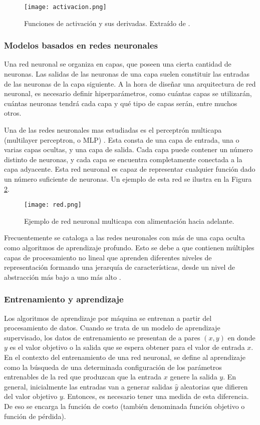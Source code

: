 \begin{figure}[H]
  \centering{}
  \texttt{[image: activacion.png]}
  \caption{Funciones de activación y sus derivadas. Extraído de \cite{lagartija}.}
  \label{fig:activación}
\end{figure}

\subsubsection{Modelos basados en redes neuronales}

Una red neuronal se organiza en capas, que poseen una cierta cantidad de neuronas. Las salidas de las neuronas de una capa suelen constituir las entradas de las neuronas de la capa siguiente. A la hora de diseñar una arquitectura de red neuronal, es necesario definir hiperparámetros, como cuántas capas se utilizarán, cuántas neuronas tendrá cada capa y qué tipo de capas serán, entre muchos otros.

Una de las redes neuronales mas estudiadas es el perceptrón multicapa (multilayer perceptron, o MLP) \cite{MLP2}. Esta consta de una capa de entrada, una o varias capas ocultas, y una capa de salida. Cada capa puede contener un número distinto de neuronas, y cada capa se encuentra completamente conectada a la capa adyacente. Esta red neuronal es capaz de representar cualquier función dado un número suficiente de neuronas. Un ejemplo de esta red se ilustra en la Figura \ref{fig:red}.

\begin{figure}[H]
  \centering{}
  \texttt{[image: red.png]}
  \caption{Ejemplo de red neuronal multicapa con alimentación hacia adelante.}
  \label{fig:red}
\end{figure}

Frecuentemente se cataloga a las redes neuronales con más de una capa oculta como algoritmos de aprendizaje profundo. Esto se debe a que contienen múltiples capas de procesamiento no lineal que aprenden diferentes niveles de representación formando una jerarquía de características, desde un nivel de abstracción más bajo a uno más alto \cite{franchute}.  

\subsubsection{Entrenamiento y aprendizaje}

Los algoritmos de aprendizaje por máquina se entrenan a partir del procesamiento de datos. Cuando se trata de un modelo de aprendizaje supervisado, los datos de entrenamiento se presentan de a pares $(x,y)$ en donde $y$ es el valor objetivo o la salida que se espera obtener para el valor de entrada $x$. En el contexto del entrenamiento de una red neuronal, se define al aprendizaje como la búsqueda de una determinada configuración de los parámetros entrenables de la red que produzcan que la entrada $x$ genere la salida $y$. En general, inicialmente las entradas van a generar salidas $\hat{y}$ aleatorias que difieren del valor objetivo $y$. Entonces, es necesario tener una medida de esta diferencia. De eso se encarga la función de costo (también denominada función objetivo o función de pérdida).

